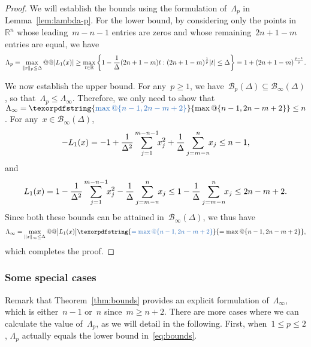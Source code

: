 \documentclass{article}
\numberwithin{equation}{section}
\theoremstyle{definition}
\theoremstyle{plain}
\theoremstyle{remark}
\newcommand*{\abs}[2][]{#1\lvert#2#1\rvert}
\newcommand*{\norm}[2][]{#1\lVert#2#1\rVert}
\newcommand*{\set}[2][]{#1\{#2#1\}}
\newcommand*{\R}{\mathbb{R}}
\newcommand*{\lagp}[1][]{L\ifblank{#1}{}{_{#1}}}
\newcommand{\reviewed}[1]{\texorpdfstring{{\color{NavyBlue}#1}}{#1}}
\begin{document}
\begin{proof}
    We will establish the bounds using the formulation of~$\Lambda_p$ in Lemma~\ref{lem:lambda-p}.
    For the lower bound, by considering only the points in~$\R^n$ whose leading~$m - n - 1$ entries are zeros and whose remaining~$2n + 1 - m$ entries are equal, we have
    \begin{equation*}
        \Lambda_p = \max_{\norm{x}_p \le \Delta} @@ \abs{\lagp[1](x)} \ge \max_{t \in \R} \set[\bigg]{1 - \frac{1}{\Delta} (2n + 1 - m) t : (2n + 1 - m)^{\frac{1}{p}}\abs{t} \le \Delta} = 1 + (2n + 1 - m)^{\frac{p - 1}{p}}.
    \end{equation*}

    We now establish the upper bound.
    For any~$p \ge 1$, we have~$\mathcal{B}_p(\Delta) \subseteq \mathcal{B}_{\infty}(\Delta)$, so that~$\Lambda_p \le \Lambda_{\infty}$.
    Therefore, we only need to show that~$\Lambda_{\infty} = \reviewed{\max @ \set{n - 1, 2n - m + 2}} \le n$.
    For any~$x \in \mathcal{B}_{\infty}(\Delta)$,
    \begin{equation*}
        -\lagp[1](x) = -1 + \frac{1}{\Delta^2} \sum_{j = 1}^{m - n - 1} \!\! x_j^2 + \frac{1}{\Delta} \sum_{j = m - n}^n \!\! x_j \le n-1,
    \end{equation*}
    and
    \begin{equation*}
        \lagp[1](x) = 1 - \frac{1}{\Delta^2} \sum_{j = 1}^{m - n - 1} \!\! x_j^2 - \frac{1}{\Delta} \sum_{j = m - n}^n \!\! x_j \le 1 -  \frac{1}{\Delta} \sum_{j = m - n}^n \!\! x_j \le 2n-m+2.
    \end{equation*}
    \reviewed{Since both these bounds can be attained in~$\mathcal{B}_{\infty}(\Delta)$, we thus have}
    \begin{equation*}
        \Lambda_{\infty} = \max_{\norm{x}_{\infty} \le \Delta} @@ \abs[\big]{\lagp[1](x)} \reviewed{= \max @ \set{n - 1, 2n - m + 2}},
    \end{equation*}
    which completes the proof.
\end{proof}

\subsubsection{Some special cases}

\reviewed{Remark that Theorem~\ref{thm:bounds} provides an explicit formulation of~$\Lambda_{\infty}$, which is either~$n - 1$ or~$n$ since~$m \ge n + 2$.}
There are more cases where we can calculate the value of~$\Lambda_p$, as we will detail in the following.
First, when~$1 \le p \le 2$, $\Lambda_p$ actually equals the lower bound in~\eqref{eq:bounds}.
\end{document}
